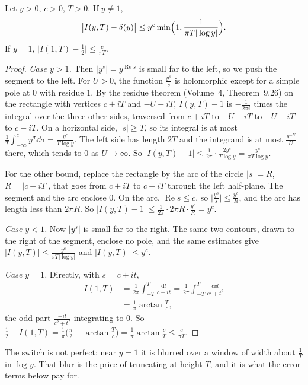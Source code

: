 \begin{lemma}[Perron]\label{lem:perron}
Let $y>0$, $c>0$, $T>0$. If $y\ne1$,
\[
\bigl|I(y,T)-\delta(y)\bigr|\le y^c\min\Bigl(1,\frac1{\pi T|\log y|}\Bigr).
\]
If $y=1$, $\bigl|I(1,T)-\frac12\bigr|\le\frac c{\pi T}$.
\end{lemma}
\begin{proof}
\emph{Case $y>1$.} Then $|y^s|=y^{\operatorname{Re}s}$ is small far to the left, so we push the segment to the left. For $U>0$, the function $\frac{y^s}s$ is holomorphic except for a simple pole
at $0$ with residue $1$. By the residue theorem (Volume~4, Theorem~9.26) on the rectangle with vertices $c\pm iT$ and $-U\pm iT$, $I(y,T)-1$ is $-\frac1{2\pi i}$ times the integral over
the three other sides, traversed from $c+iT$ to $-U+iT$ to $-U-iT$ to $c-iT$. On a horizontal side, $|s|\ge T$, so its integral is at most
$\frac1T\int_{-\infty}^cy^\sigma\dd\sigma=\frac{y^c}{T\log y}$. The left side has length $2T$ and the integrand is at most $\frac{y^{-U}}U$ there, which tends to $0$ as $U\to\infty$. So
$|I(y,T)-1|\le\frac1{2\pi}\cdot\frac{2y^c}{T\log y}=\frac{y^c}{\pi T\log y}$.

For the other bound, replace the rectangle by the arc of the circle $|s|=R$, $R=|c+iT|$, that goes from $c+iT$ to $c-iT$ through the left half-plane. The segment and the arc enclose $0$. On the
arc, $\operatorname{Re}s\le c$, so $\bigl|\frac{y^s}s\bigr|\le\frac{y^c}R$, and the arc has length less than $2\pi R$. So $|I(y,T)-1|\le\frac1{2\pi}\cdot2\pi R\cdot\frac{y^c}R=y^c$.

\emph{Case $y<1$.} Now $|y^s|$ is small far to the right. The same two contours, drawn to the right of the segment, enclose no pole, and the same estimates give
$|I(y,T)|\le\frac{y^c}{\pi T|\log y|}$ and $|I(y,T)|\le y^c$.

\emph{Case $y=1$.} Directly, with $s=c+it$,
\[
\begin{aligned}I(1,T)&=\frac1{2\pi}\int_{-T}^T\frac{\mathrm dt}{c+it}=\frac1{2\pi}\int_{-T}^T\frac{c\dd t}{c^2+t^2}\\&=\frac1\pi\arctan\frac Tc,\end{aligned}
\]
the odd part $\frac{-it}{c^2+t^2}$ integrating to $0$. So $\frac12-I(1,T)=\frac1\pi\bigl(\frac\pi2-\arctan\frac Tc\bigr)=\frac1\pi\arctan\frac cT\le\frac c{\pi T}$.
\end{proof}

The switch is not perfect: near $y=1$ it is blurred over a window of width about $\frac1T$ in $\log y$. That blur is the price of truncating at height $T$, and it is what the error terms
below pay for.

